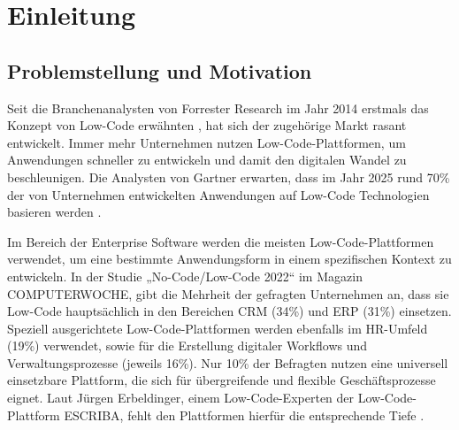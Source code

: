 
\chapter{Einleitung} \label{EL}

\section{Problemstellung und Motivation}
Seit die Branchenanalysten von Forrester Research im Jahr 2014 erstmals das Konzept von Low-Code erwähnten \cite{lcnc:ndp}, hat sich der zugehörige Markt rasant entwickelt. Immer mehr Unternehmen nutzen Low-Code-Plattformen, um Anwendungen schneller zu entwickeln und damit den digitalen Wandel zu beschleunigen. Die Analysten von Gartner erwarten, dass im Jahr 2025 rund 70\% der von Unternehmen entwickelten Anwendungen auf Low-Code Technologien basieren werden \cite{lcnc:lcp}. 

Im Bereich der Enterprise Software werden die meisten Low-Code-Plattformen verwendet, um eine bestimmte Anwendungsform in einem spezifischen Kontext zu entwickeln. In der Studie „No-Code/Low-Code 2022“ im Magazin COMPUTERWOCHE, gibt die Mehrheit der gefragten Unternehmen an, dass sie Low-Code hauptsächlich in den Bereichen CRM (34\%) und ERP (31\%) einsetzen. Speziell ausgerichtete Low-Code-Plattformen werden ebenfalls im HR-Umfeld (19\%)  verwendet, sowie für die Erstellung digitaler Workflows und Verwaltungsprozesse (jeweils 16\%). Nur 10\% der Befragten nutzen eine universell einsetzbare Plattform, die sich für übergreifende und flexible Geschäftsprozesse eignet. Laut Jürgen Erbeldinger, einem Low-Code-Experten der Low-Code-Plattform ESCRIBA, fehlt den Plattformen hierfür die entsprechende Tiefe \cite{lcnc:nclc}.

